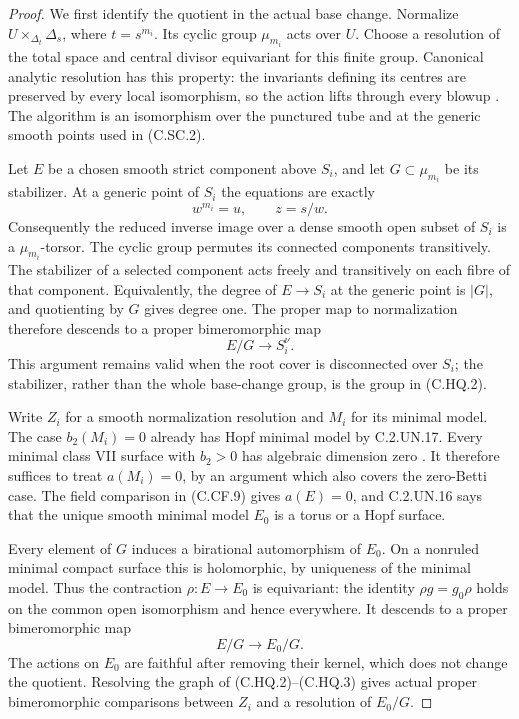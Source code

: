 \begin{proof}
We first identify the quotient in the actual base change.
Normalize $U\times_{\Delta_t}\Delta_s$, where
$t=s^{m_i}$. Its cyclic group $\mu_{m_i}$ acts over $U$.
Choose a resolution of the total space and central divisor
equivariant for this finite group. Canonical analytic
resolution has this property: the invariants defining its
centres are preserved by every local isomorphism, so the
action lifts through every blowup
\cite[\S1, universal and canonical desingularization]{BierstoneMilman1997}.
The algorithm is an isomorphism over the punctured tube
and at the generic smooth points used in (C.SC.2).

Let $E$ be a chosen smooth strict component above $S_i$,
and let $G\subset\mu_{m_i}$ be its stabilizer. At a
generic point of $S_i$ the equations are exactly
\[
                 w^{m_i}=u,\qquad z=s/w.
 \tag{C.HQ.1}
\]
Consequently the reduced inverse image over a dense
smooth open subset of $S_i$ is a $\mu_{m_i}$-torsor.
The cyclic group permutes its connected components
transitively. The stabilizer of a selected component
acts freely and transitively on each fibre of that
component. Equivalently, the degree of $E\to S_i$
at the generic point is $|G|$, and quotienting by
$G$ gives degree one. The proper map to normalization
therefore descends to a proper bimeromorphic map
\[
                         E/G\longrightarrow S_i^\nu.
 \tag{C.HQ.2}
\]
This argument remains valid when the root cover is
disconnected over $S_i$; the stabilizer, rather than
the whole base-change group, is the group in (C.HQ.2).

Write $Z_i$ for a smooth normalization resolution and
$M_i$ for its minimal model. The case $b_2(M_i)=0$
already has Hopf minimal model by C.2.UN.17. Every
minimal class VII surface with $b_2>0$ has algebraic
dimension zero \cite[p.~256]{DOT2000}. It therefore
suffices to treat $a(M_i)=0$, by an argument which
also covers the zero-Betti case. The field comparison
in (C.CF.9) gives
$a(E)=0$, and C.2.UN.16 says that the unique smooth
minimal model $E_0$ is a torus or a Hopf surface.

Every element of $G$ induces a birational automorphism
of $E_0$. On a nonruled minimal compact surface this
is holomorphic, by uniqueness of the minimal model.
Thus the contraction $\rho:E\to E_0$ is equivariant:
the identity $\rho g=g_0\rho$ holds on the common
open isomorphism and hence everywhere. It descends
to a proper bimeromorphic map
\[
                    E/G\longrightarrow E_0/G.
 \tag{C.HQ.3}
\]
The actions on $E_0$ are faithful after removing
their kernel, which does not change the quotient.
Resolving the graph of (C.HQ.2)--(C.HQ.3) gives
actual proper bimeromorphic comparisons between
$Z_i$ and a resolution of $E_0/G$.


\end{proof}
